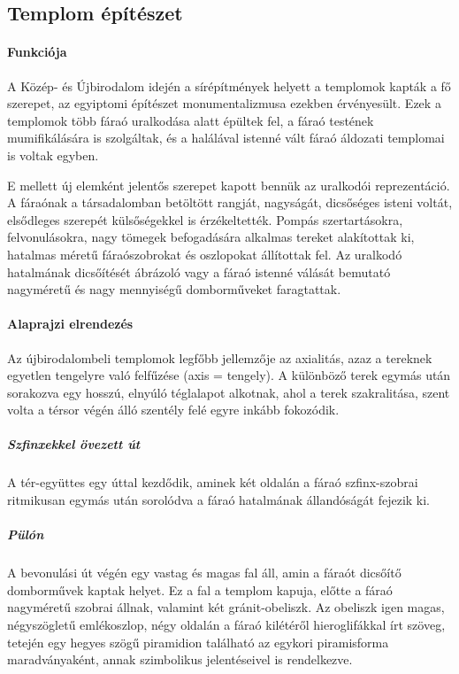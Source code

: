 \clearpage

\subsection*{Templom építészet}

\paragraph{Funkciója}
A Közép- és Újbirodalom idején a sírépítmények helyett a templomok kapták a fő szerepet, az egyiptomi építészet monumentalizmusa ezekben érvényesült. Ezek a templomok több fáraó uralkodása alatt épültek fel, a fáraó testének mumifikálására is szolgáltak, és a halálával istenné vált fáraó áldozati templomai is voltak egyben.

E mellett új elemként jelentős szerepet kapott bennük az uralkodói reprezentáció. A fáraónak a társadalomban betöltött rangját, nagyságát, dicsőséges isteni voltát, elsődleges szerepét külsőségekkel is érzékeltették. Pompás szertartásokra, felvonulásokra, nagy tömegek befogadására alkalmas tereket alakítottak ki, hatalmas méretű fáraószobrokat és oszlopokat állítottak fel. Az uralkodó hatalmának dicsőítését ábrázoló vagy a fáraó istenné válását bemutató nagyméretű és nagy mennyiségű domborműveket faragtattak.

\paragraph{Alaprajzi elrendezés}

Az újbirodalombeli templomok legfőbb jellemzője az axialitás, azaz a tereknek egyetlen tengelyre való felfűzése (axis = tengely). A különböző terek egymás után sorakozva egy hosszú, elnyúló téglalapot alkotnak, ahol a terek szakralitása, szent volta a térsor végén álló szentély felé egyre inkább fokozódik.

\subparagraph{Szfinxekkel övezett út} A tér-együttes egy úttal kezdődik, aminek két oldalán a fáraó szfinx-szobrai ritmikusan egymás után sorolódva a fáraó hatalmának állandóságát fejezik ki.

\subparagraph{Pülón} A bevonulási út végén egy vastag és magas fal áll, amin a fáraót dicsőítő domborművek kaptak helyet. Ez a fal a templom kapuja, előtte a fáraó nagyméretű szobrai állnak, valamint két gránit-obeliszk. Az obeliszk igen magas, négyszögletű emlékoszlop, négy oldalán a fáraó kilétéről hieroglifákkal írt szöveg, tetején egy hegyes szögű piramidion található az egykori piramisforma maradványaként, annak szimbolikus jelentéseivel is rendelkezve.

